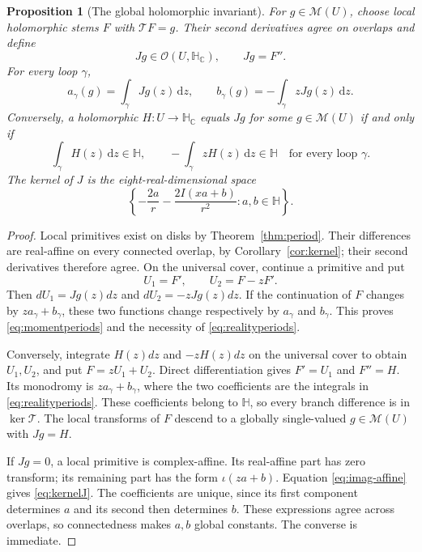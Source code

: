 \documentclass[11pt,a4paper]{article}
\numberwithin{equation}{section}
\newtheorem{proposition}[theorem]{Proposition}
\theoremstyle{definition}
\theoremstyle{remark}
\newcommand{\C}{\mathbb C}
\newcommand{\HH}{\mathbb H}
\newcommand{\HC}{\mathbb H_{\C}}
\newcommand{\cM}{\mathscr M}
\newcommand{\T}{\mathcal T}
\newcommand{\dd}{\,\mathrm d}
\begin{document}
\begin{proposition}[The global holomorphic invariant]
\label{prop:encoding}
For $g\in\cM(U)$, choose local holomorphic stems $F$ with $\T F=g$.
Their second derivatives agree on overlaps and define
\[
 Jg\in\mathcal O(U,\HC),\qquad Jg=F''.
\]
For every loop $\gamma$,
\begin{equation}
 a_\gamma(g)=\int_\gamma Jg(z)\dd z,\qquad
 b_\gamma(g)=-\int_\gamma zJg(z)\dd z.
 \label{eq:momentperiods}
\end{equation}
Conversely, a holomorphic $H:U\to\HC$ equals $Jg$ for some
$g\in\cM(U)$ if and only if
\begin{equation}
 \int_\gamma H(z)\dd z\in\HH,\qquad
 -\int_\gamma zH(z)\dd z\in\HH
 \quad\text{for every loop }\gamma.
 \label{eq:realityperiods}
\end{equation}
The kernel of $J$ is the eight-real-dimensional space
\begin{equation}
 \left\{-\frac{2a}{r}-\frac{2I(xa+b)}{r^2}:a,b\in\HH\right\}.
 \label{eq:kernelJ}
\end{equation}
\end{proposition}
\begin{proof}
Local primitives exist on disks by Theorem~\ref{thm:period}. Their
differences are real-affine on every connected overlap, by
Corollary~\ref{cor:kernel}; their second derivatives therefore agree.
On the universal cover, continue a primitive and put
\[
 U_1=F',\qquad U_2=F-zF'.
\]
Then $dU_1=Jg(z)dz$ and $dU_2=-zJg(z)dz$. If the continuation of $F$
changes by $za_\gamma+b_\gamma$, these two functions change respectively
by $a_\gamma$ and $b_\gamma$. This proves \eqref{eq:momentperiods} and
the necessity of \eqref{eq:realityperiods}.

Conversely, integrate $H(z)dz$ and $-zH(z)dz$ on the universal cover to
obtain $U_1,U_2$, and put $F=zU_1+U_2$. Direct differentiation gives
$F'=U_1$ and $F''=H$. Its monodromy is $za_\gamma+b_\gamma$, where the
two coefficients are the integrals in \eqref{eq:realityperiods}. These
coefficients belong to $\HH$, so every branch difference is in
$\ker\T$. The local transforms of $F$ descend to a globally single-valued
$g\in\cM(U)$ with $Jg=H$.

If $Jg=0$, a local primitive is complex-affine. Its real-affine part has
zero transform; its remaining part has the form $\iota(za+b)$.
Equation \eqref{eq:imag-affine} gives \eqref{eq:kernelJ}. The coefficients
are unique, since its first component determines $a$ and its second then
determines $b$. These expressions agree across overlaps, so connectedness
makes $a,b$ global constants. The converse is immediate.
\end{proof}
\end{document}
